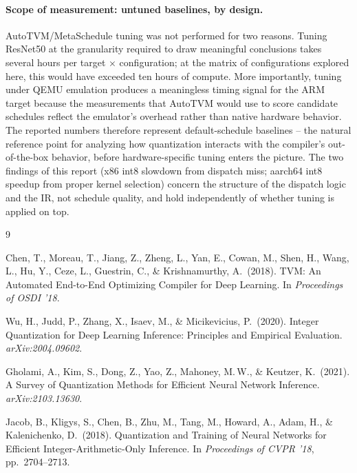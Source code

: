 \documentclass[11pt,a4paper]{article}
\begin{document}
\paragraph{Scope of measurement: untuned baselines, by design.} AutoTVM/MetaSchedule tuning was not performed for two reasons. Tuning ResNet50 at the granularity required to draw meaningful conclusions takes several hours per target $\times$ configuration; at the matrix of configurations explored here, this would have exceeded ten hours of compute. More importantly, tuning under QEMU emulation produces a meaningless timing signal for the ARM target because the measurements that AutoTVM would use to score candidate schedules reflect the emulator's overhead rather than native hardware behavior. The reported numbers therefore represent default-schedule baselines -- the natural reference point for analyzing how quantization interacts with the compiler's out-of-the-box behavior, before hardware-specific tuning enters the picture. The two findings of this report (x86 int8 slowdown from dispatch miss; aarch64 int8 speedup from proper kernel selection) concern the structure of the dispatch logic and the IR, not schedule quality, and hold independently of whether tuning is applied on top.


\begin{thebibliography}{9}

Chen, T., Moreau, T., Jiang, Z., Zheng, L., Yan, E., Cowan, M., Shen, H., Wang, L., Hu, Y., Ceze, L., Guestrin, C., \& Krishnamurthy, A.\ (2018).
TVM: An Automated End-to-End Optimizing Compiler for Deep Learning.
In \textit{Proceedings of OSDI '18}.

Wu, H., Judd, P., Zhang, X., Isaev, M., \& Micikevicius, P.\ (2020).
Integer Quantization for Deep Learning Inference: Principles and Empirical Evaluation.
\textit{arXiv:2004.09602}.

Gholami, A., Kim, S., Dong, Z., Yao, Z., Mahoney, M.\,W., \& Keutzer, K.\ (2021).
A Survey of Quantization Methods for Efficient Neural Network Inference.
\textit{arXiv:2103.13630}.

Jacob, B., Kligys, S., Chen, B., Zhu, M., Tang, M., Howard, A., Adam, H., \& Kalenichenko, D.\ (2018).
Quantization and Training of Neural Networks for Efficient Integer-Arithmetic-Only Inference.
In \textit{Proceedings of CVPR '18}, pp.\ 2704--2713.

\end{thebibliography}
\end{document}
